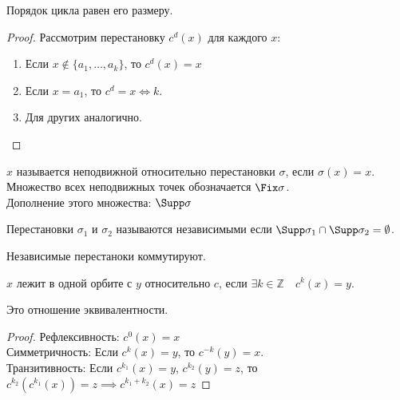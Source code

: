 \documentclass[11pt, oneside]{article}   	%
\begin{document}
    \begin{theorem}
        Порядок цикла равен его размеру.
        \begin{proof}
            Рассмотрим перестановку $c^{d}(x)$ для каждого $x$:
            \begin{enumerate}
                \item Если $x \not\in \{a_1, \ldots, a_k\} $, то $c^{d}(x)=x$ 
                \item Если $x=a_1$, то $c^{d} = x \iff k$.
                \item Для других аналогично.
            \end{enumerate}
        \end{proof}
    \end{theorem}
    \begin{definition}
        $x$  называется неподвижной относительно перестановки $\sigma$, если $\sigma(x) = x$.\\
        Множество всех неподвижных точек обозначается $\Fix\sigma$.\\
        Дополнение этого множества: $\Supp\sigma$
    \end{definition}
    \begin{definition}
        Перестановки $\sigma_1$ и $\sigma_2$ называются независимыми если $\Supp \sigma_1\cap \Supp \sigma_2 = \emptyset$.
    \end{definition}
    \begin{dlemma}
        Независимые перестаноки коммутируют.
    \end{dlemma}
    \begin{definition}
        $x$ лежит в одной орбите с $y$ относительно $c$, если $\exists{k\in \mathbb{Z}}\quad c^{k}(x) = y$.
    \end{definition}
    \begin{dlemma}
        Это отношение эквивалентности.\\
        \begin{proof}
            Рефлексивность: $c^{0}(x) = x$\\
            Симметричность: Если $c^{k}(x) = y$, то $c^{-k}(y) = x$.\\
            Транзитивность: Если $c^{k_1}(x) = y$, $c^{k_2}(y) = z$, то $c^{k_2}(c^{k_1}(x)) = z \implies c^{k_1+k_2}(x) = z$  
        \end{proof}
    \end{dlemma}
\end{document}
